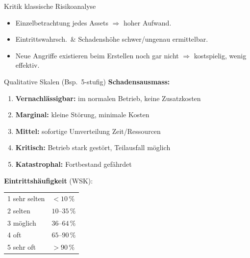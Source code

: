 \documentclass[a4paper, fontsize=7pt]{scrartcl}
\renewcommand*{\arraystretch}{1.5}  %
\begin{document}
\begin{subbox}{Kritik klassische Risikoanalyse}
\begin{itemize}
    \item Einzelbetrachtung jedes Assets $\Rightarrow$ hoher Aufwand.
    \item Eintrittswahrsch.\ \& Schadenshöhe schwer/ungenau ermittelbar.
    \item Neue Angriffe existieren beim Erstellen noch gar nicht
          $\Rightarrow$ kostspielig, wenig effektiv.
\end{itemize}
\end{subbox}

\begin{mainbox}{Qualitative Skalen (Bsp.\ 5-stufig)}
\textbf{Schadensausmass:}
\begin{enumerate}
    \item \textbf{Vernachlässigbar:} im normalen Betrieb, keine Zusatzkosten
    \item \textbf{Marginal:} kleine Störung, minimale Kosten
    \item \textbf{Mittel:} sofortige Umverteilung Zeit/Ressourcen
    \item \textbf{Kritisch:} Betrieb stark gestört, Teilausfall möglich
    \item \textbf{Katastrophal:} Fortbestand gefährdet
\end{enumerate}
\textbf{Eintrittshäufigkeit} (WSK):
\renewcommand*{\arraystretch}{1.1}
\begin{center}
\begin{tabular}{l|l}
1 sehr selten & $<10\,\%$ \\
2 selten & $10$--$35\,\%$ \\
3 möglich & $36$--$64\,\%$ \\
4 oft & $65$--$90\,\%$ \\
5 sehr oft & $>90\,\%$ \\
\end{tabular}
\end{center}
\end{mainbox}
\end{document}
